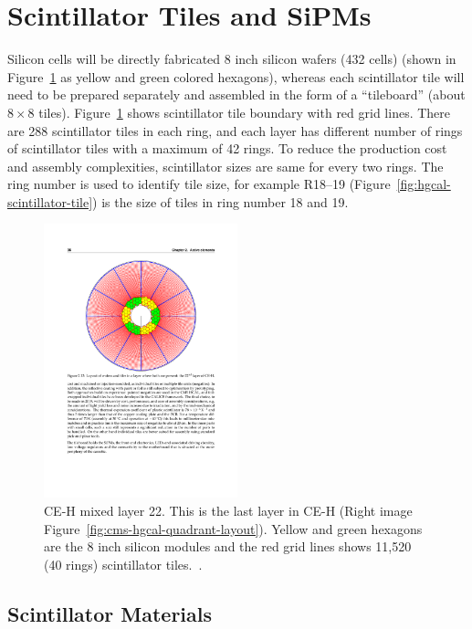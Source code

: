 \clearpage
\section{
  Scintillator Tiles and SiPMs
 }

Silicon cells will be directly fabricated 8 inch silicon wafers (432
cells) (shown
in Figure~\ref{fig:hgcal-layer-22} as yellow and green colored hexagons),
whereas each scintillator tile will need to be prepared separately
and assembled in the form of a ``tileboard'' (about \(8\times 8\) tiles).
Figure~\ref{fig:hgcal-layer-22} shows scintillator
tile boundary with red grid lines. There are 288
scintillator tiles in
each ring, and each layer has different
number of rings of scintillator tiles with a maximum of 42 rings. To reduce
the production cost and assembly complexities, scintillator sizes are
same for every two rings. The ring number is used to identify tile
size, for example R18--19 (Figure~\ref{fig:hgcal-scintillator-tile}) is the size of tiles in ring number 18 and 19.

\begin{figure}[!ht]
  \centering
  \includegraphics[trim={129 389 127 113},clip,width=0.5\textwidth]{figures/hgcal/page36_TDR_HGCAL.pdf}
  \caption[CE-H mixed layer 22]
  {CE-H mixed layer 22. This is the last layer
    in CE-H (Right image Figure~\ref{fig:cms-hgcal-quadrant-layout}).
    Yellow and green hexagons are the
    8 inch silicon modules and the red grid lines shows
    11,520 (40 rings) scintillator tiles.~\cite{cms-hgcal-tdr}.}%
  \label{fig:hgcal-layer-22}
\end{figure}

\subsection{
  Scintillator Materials
}

